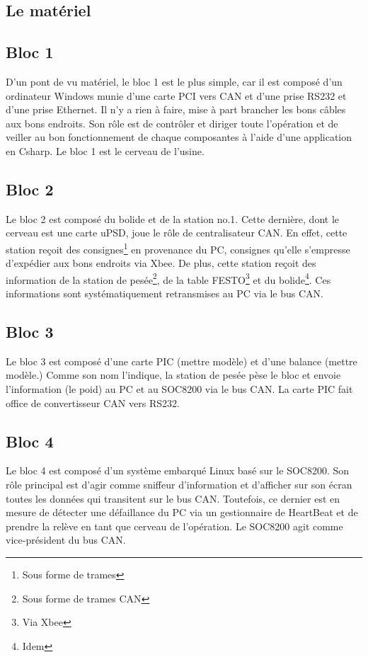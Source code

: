\documentclass[10pt,a4paper,final]{article}
\begin{document}
\begin{spacing}{1.5}


\pagebreak

\section{Le matériel}
\subsection{Bloc 1}
D'un pont de vu matériel, le bloc 1 est le plus simple, car il est composé d'un ordinateur Windows munie d'une carte PCI vers CAN et d'une prise RS232 et d'une prise Ethernet. Il n'y a rien à faire, mise à part brancher les bons câbles aux bons endroits. Son rôle est de contrôler et diriger toute l'opération et de veiller au bon fonctionnement de chaque composantes à l'aide d'une application en Csharp. Le bloc 1 est le cerveau de l'usine.

\subsection{Bloc 2}
Le bloc 2 est composé du bolide et de la station no.1. Cette dernière, dont le cerveau est une carte uPSD, joue le rôle de centralisateur CAN. En effet, cette station reçoit des consignes\footnote{Sous forme de trames} en provenance du PC, consignes qu'elle s'empresse d'expédier aux bons endroits via Xbee. De plus, cette station reçoit des information de la station de pesée\footnote{Sous forme de trames CAN}, de la table FESTO\footnote{Via Xbee} et du bolide\footnote{Idem}. Ces informations sont systématiquement retransmises au PC via le bus CAN.

\subsection{Bloc 3}
Le bloc 3 est composé d'une carte PIC (mettre modèle) et d'une balance (mettre modèle.) Comme son nom l'indique, la station de pesée pèse le bloc et envoie l'information (le poid) au PC et au SOC8200 via le bus CAN. La carte PIC fait office de convertisseur CAN vers RS232.

\subsection{Bloc 4}
Le bloc 4 est composé d'un système embarqué Linux basé sur le SOC8200. Son rôle principal est d'agir comme sniffeur d'information et d'afficher sur son écran toutes les données qui transitent sur le bus CAN. Toutefois, ce dernier est en mesure de détecter une défaillance du PC via un gestionnaire de HeartBeat et de prendre la relève en tant que cerveau de l'opération. Le SOC8200 agit comme vice-président du bus CAN.


\end{spacing}
\end{document}
